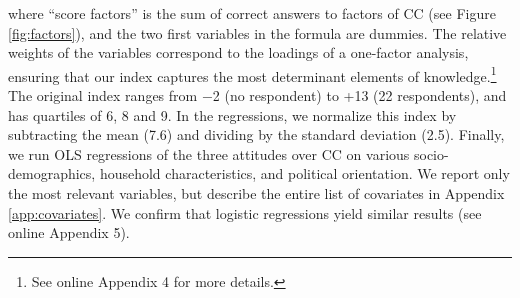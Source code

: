 \documentclass[english,5p,authoryear]{elsarticle}
\begin{document}
where ``score factors'' is the sum of correct answers to factors of CC (see Figure \ref{fig:factors}), and the two first variables in the formula are dummies. The relative weights of the variables correspond to the loadings of a one-factor analysis, ensuring that our index captures the most determinant elements of knowledge.\footnote{See online Appendix 4 for more details.} The original index ranges from $-$2 (no respondent) to +13 (22 respondents), and has quartiles of 6, 8 and 9. In the regressions, we normalize this index by subtracting the mean (7.6) and dividing by the standard deviation (2.5). Finally, we run OLS regressions of the three attitudes over CC on various socio-demographics, household characteristics, and political orientation. We report only the most relevant variables, but describe the entire list of covariates in Appendix \ref{app:covariates}. We confirm that logistic regressions yield similar results (see online Appendix 5).
\end{document}
